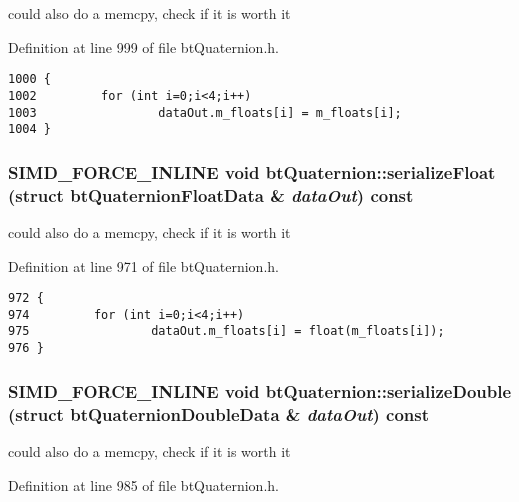 could also do a memcpy, check if it is worth it 

Definition at line 999 of file btQuaternion.h.

\begin{Code}\begin{verbatim}1000 {
1002         for (int i=0;i<4;i++)
1003                 dataOut.m_floats[i] = m_floats[i];
1004 }
\end{verbatim}
\end{Code}


\hypertarget{classbt_quaternion_239a6d8a3dc3904adc6ec07151895a85}{
\subsubsection[serializeFloat]{\setlength{\rightskip}{0pt plus 5cm}SIMD\_\-FORCE\_\-INLINE void btQuaternion::serializeFloat (struct btQuaternionFloatData \& {\em dataOut}) const}}
\label{classbt_quaternion_239a6d8a3dc3904adc6ec07151895a85}




could also do a memcpy, check if it is worth it 

Definition at line 971 of file btQuaternion.h.

\begin{Code}\begin{verbatim}972 {
974         for (int i=0;i<4;i++)
975                 dataOut.m_floats[i] = float(m_floats[i]);
976 }
\end{verbatim}
\end{Code}


\hypertarget{classbt_quaternion_23f1203633c7afb3750a9e95fae30f40}{
\subsubsection[serializeDouble]{\setlength{\rightskip}{0pt plus 5cm}SIMD\_\-FORCE\_\-INLINE void btQuaternion::serializeDouble (struct btQuaternionDoubleData \& {\em dataOut}) const}}
\label{classbt_quaternion_23f1203633c7afb3750a9e95fae30f40}




could also do a memcpy, check if it is worth it 

Definition at line 985 of file btQuaternion.h.

